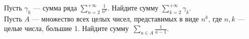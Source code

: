 \documentclass[a4paper, 12pt]{article}
\begin{document}
Пусть $\gamma_k$ --- сумма ряда
$\sum\limits_{n=2}^{+\infty}\frac1{n^k}$.
Найдите сумму $\sum\limits_{k=2}^{+\infty}\gamma_k$.\\
Пусть $A$ --- множество всех целых
чисел, представимых в виде $n^k$, где $n,k$ --- %
целые числа, большие 1.
Найдите сумму~\hbox{$\sum\limits_{a\in A}\frac1{a-1}$.}

\end{document}
